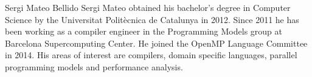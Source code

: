 \begin{IEEEbiography}{Sergi Mateo Bellido}
Sergi Mateo obtained his bachelor’s degree in Computer Science by the
Universitat Polit\`ecnica de Catalunya in 2012. Since 2011 he has been working as
a compiler engineer in the Programming Models group at Barcelona Supercomputing
Center. He joined the OpenMP Language Committee in 2014. His areas of interest
are compilers, domain specific languages, parallel programming models and
performance analysis.
\end{IEEEbiography}


